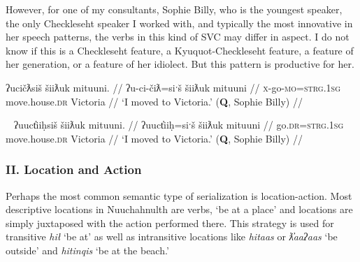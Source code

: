However, for one of my consultants, Sophie Billy, who is the youngest speaker, the only Checkleseht speaker I worked with, and typically the most innovative in her speech patterns, the verbs in this kind of SVC may differ in aspect. I do not know if this is a Checkleseht feature, a Kyuquot-Checkleseht feature, a feature of her generation, or a feature of her idiolect. But this pattern is productive for her.

\ex \label{ex:movetovictoria1}
\begingl
\glpreamble ʔucičƛsiš šiiƛuk mituuni. //
\gla ʔu-ci-čiƛ=siˑš šiiƛuk mituuni  //
\glb \textsc{x}-go-\textsc{mo}=\textsc{strg.1sg} move.house.\textsc{dr} Victoria //
\glft `I moved to Victoria.' (\textbf{Q}, Sophie Billy) //
\endgl
\xe

\ex~ \label{ex:movetovictoria2}
\begingl
\glpreamble ʔuuct̓iiḥsiš šiiƛuk mituuni. //
\gla ʔuuct̓iiḥ=siˑš šiiƛuk mituuni  //
\glb go.\textsc{dr}=\textsc{strg.1sg} move.house.\textsc{dr} Victoria //
\glft `I moved to Victoria.' (\textbf{Q}, Sophie Billy) //
\endgl
\xe

\begin{comment}
Ordering preference. One of my speakers expressed a strong preference for the manner verb to precede the action. This mirrors how adverbs are used in Nuuchahnulth, which also tend to precede the verb. Other speakers I consulted with were comfortable with the verbs coming in either order.

\ex \label{ex:gohomedrive}
\begingl
\glpreamble ʔucičƛsiš šiiƛuk mituuni. //
\gla ʔu-ci-čiƛ=siˑš šiiƛuk mituuni  //
\glb \textsc{x}-go-\textsc{mo}=\textsc{strg.1sg} move.house-\textsc{dr} Victoria //
\glft `I moved to Victoria.' (\textbf{Q}, Sophie Billy) //
\endgl
\xe
FH
*waałšiʔaƛs ƛiiƛiiḥataḥ.
waałšiʔaƛs. ƛiiƛiiḥataḥʔaƛs.
\end{comment}

\vspace{10pt}

\subsubsection{II. Location and Action}

\vspace{10pt}

Perhaps the most common semantic type of serialization is location-action. Most descriptive locations in Nuuchahnulth are verbs, `be at a place' and locations are simply juxtaposed with the action performed there. This strategy is used for transitive \textit{hił} `be at' as well as intransitive locations like \textit{hitaas} or \textit{ƛ̓aaʔaas} `be outside' and \textit{hitinqis} `be at the beach.'

